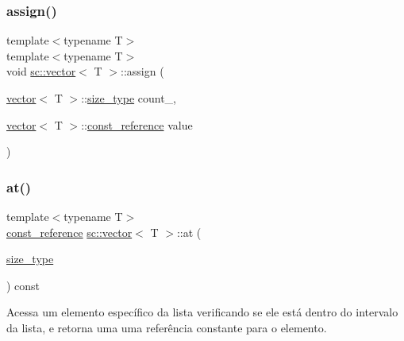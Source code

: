 \subsubsection{\texorpdfstring{assign()}{assign()}\hspace{0.1cm}{\footnotesize\ttfamily [4/4]}}
{\footnotesize\ttfamily template$<$typename T$>$ \\
template$<$typename T$>$ \\
void \hyperlink{classsc_1_1vector}{sc\+::vector}$<$ T $>$\+::assign (\begin{DoxyParamCaption}\item[{\hyperlink{classsc_1_1vector}{vector}$<$ T $>$\+::\hyperlink{classsc_1_1vector_a48bf37ba1a6d0c13504414d86e27c399}{size\+\_\+type}}]{count\+\_\+,  }\item[{\hyperlink{classsc_1_1vector}{vector}$<$ T $>$\+::\hyperlink{classsc_1_1vector_a8da2b1a11b069241100f9b2e14f481a0}{const\+\_\+reference}}]{value }\end{DoxyParamCaption})}

\mbox{\label{classsc_1_1vector_aad1a99cfd4cbd7fe58bfb6439d78c8db}} 
\subsubsection{\texorpdfstring{at()}{at()}\hspace{0.1cm}{\footnotesize\ttfamily [1/2]}}
{\footnotesize\ttfamily template$<$typename T$>$ \\
\hyperlink{classsc_1_1vector_a8da2b1a11b069241100f9b2e14f481a0}{const\+\_\+reference} \hyperlink{classsc_1_1vector}{sc\+::vector}$<$ T $>$\+::at (\begin{DoxyParamCaption}\item[{\hyperlink{classsc_1_1vector_a48bf37ba1a6d0c13504414d86e27c399}{size\+\_\+type}}]{ }\end{DoxyParamCaption}) const}



Acessa um elemento específico da lista verificando se ele está dentro do intervalo da lista, e retorna uma uma referência constante para o elemento. 

\mbox{\label{classsc_1_1vector_ae3f1a60bf1dac7bdf96b78e708d6e2ca}} 
